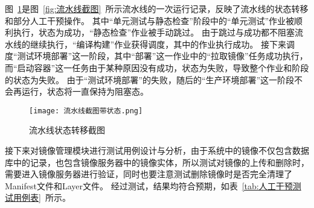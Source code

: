 图~\ref{fig:流水线状态转移截图}是图~\ref{fig:流水线截图}~所示流水线的一次运行记录，反映了流水线的状态转移和部分人工干预操作。
其中“单元测试与静态检查”阶段中的“单元测试”作业被顺利执行，状态为成功，“静态检查”作业被手动跳过。
由于跳过与成功都不阻塞流水线的继续执行，“编译构建”作业获得调度，其中的作业执行成功。
接下来调度“测试环境部署”这一阶段，其中“部署”这一作业中的“拉取镜像”任务成功执行，而“启动容器”这一任务由于某种原因没有成功，状态为失败，导致整个作业和阶段的状态为失败。
由于“测试环境部署”的失败，随后的“生产环境部署”这一阶段不会再运行，状态将一直保持为阻塞态。

\begin{figure}[h]
  \centering
  \texttt{[image: 流水线截图带状态.png]}
  \caption{流水线状态转移截图}
  \label{fig:流水线状态转移截图}
\end{figure}

接下来对镜像管理模块进行测试用例设计与分析，由于系统中的镜像不仅包含数据库中的记录，也包含镜像服务器中的镜像实体，所以测试对镜像的上传和删除时，需要进入镜像服务器进行验证，同时也要注意测试删除镜像时是否完全清理了Manifest文件和Layer文件。
经过测试，结果均符合预期，如表~\ref{tab:人工干预测试用例表}~所示。


